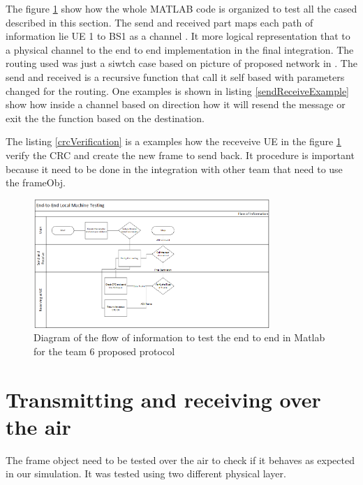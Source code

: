 The figure \ref{fig:endendDiagram} show how the whole MATLAB code is organized to test all the cased described in this section.
The send and received part maps each path of information lie UE 1 to BS1 as a channel . It more logical representation that to a physical channel to the end
to end implementation in the final integration.
The routing used was just a siwtch case based on picture of proposed network in \cite{cdproj}.
The send and received is a recursive function that call it self based with parameters changed for the routing.
One examples is shown in listing \ref{sendReceiveExample} show how inside a channel based on direction how it will resend the message or exit the the function based on the destination.


The listing \ref{crcVerification} is a examples how the receveive UE in the figure \ref{fig:endendDiagram} verify the CRC and create the new frame to send back.
It procedure is important because it need to be done in the integration with other team that need to use the frameObj.     





\begin{figure}[ht]
    \centering
    \includegraphics[width=0.8\textwidth]{flowEndtoEnd.PNG}
    \caption{Diagram of the flow of information to test the end to end in Matlab for the team 6 proposed protocol}
    \label{fig:endendDiagram}
\end{figure} 

\section{Transmitting and receiving over the air}
The frame object need to be tested over the air to check if it behaves as expected in our simulation. 
It was tested using two different physical layer. 
